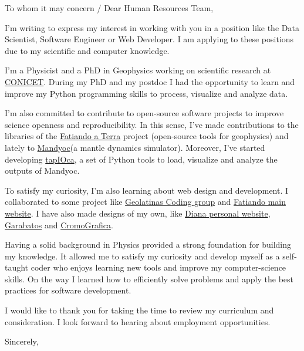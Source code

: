\documentclass[a4paper,10pt]{letter}
\date{February 25, 2021}
\begin{document}
\begin{letter}
{To whom it may concern / Dear Human Resources Team,}
\opening{}

I'm writing to express my interest in working with you in a position like the 
Data Scientist, Software Engineer or Web Developer.
I am applying to these positions due to my scientific and computer 
knowledge. 

I'm a Physicist and a PhD in Geophysics working on scientific research at
\href{https://www.conicet.gov.ar/}{CONICET}.
During my PhD and my postdoc I had the opportunity to learn and improve my
Python programming skills to process, visualize and analyze data. 

I'm also committed to contribute to open-source software projects to improve
science openness and reproducibility.
In this sense, I've made contributions to the libraries of the
\href{https://fatiando.org}{Fatiando a Terra} project (open-source tools for
geophysics) and lately to \href{https://github.com/ggciag/mandyoc}{Mandyoc}(a 
mantle dynamics simulator).
Moreover, I've started developing 
\href{https://github.com/aguspesce/tapioca}{tapIOca}, a set of Python tools to 
load, visualize and analyze the outputs of Mandyoc.

To satisfy my curiosity, I'm also learning about web design and development.
I collaborated to some project like 
\href{https://geolatinas.github.io/}{Geolatinas Coding group} and 
\href{https://www.fatiando.org/}{Fatiando main website}. 
I have also made designs of my own, like \href{https://dianaceroallard.github.io/}{Diana 
personal website}, \href{https://aguspesce.github.io/garabatos/}{Garabatos} and 
\href{https://aguspesce.github.io/web-cromografica/}{CromoGrafica}. 

Having a solid background in Physics provided a strong foundation for building 
my knowledge.
It allowed me to satisfy my curiosity and develop myself as a self-taught coder 
who enjoys learning new tools and improve my computer-science skills.
On the way I learned how to efficiently solve problems and apply the best
practices for software development.

I would like to thank you for taking the time to review my curriculum and 
consideration. 
I look forward to hearing about employment opportunities.


\closing{Sincerely,}


\end{letter}
\end{document}
